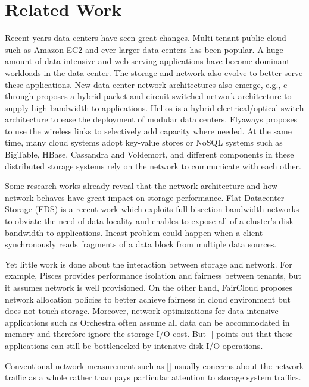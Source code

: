 \section{Related Work}
Recent years data centers have seen great changes. Multi-tenant public cloud such as Amazon EC2 and ever larger data centers has been popular. A huge amount of data-intensive and web serving applications have become dominant workloads in the data center. The storage and network also evolve to better serve these applications. New data center network architectures also emerge, e.g.,  c-through proposes a hybrid packet and circuit switched network architecture to supply high bandwidth to applications. Helios is a hybrid electrical/optical switch architecture to ease the deployment of modular data centers. Flyaways proposes to use the wireless links to selectively add capacity where needed. At the same time, many cloud systems adopt key-value stores or NoSQL systems such as BigTable, HBase, Cassandra and Voldemort, and different components in these distributed storage systems rely on the network to communicate with each other.

Some research works already reveal that the network architecture and how network behaves have great impact on storage performance. Flat Datacenter Storage (FDS) is a recent work which exploits full bisection bandwidth networks to obviate the need of data locality and enables to expose all of a cluster’s disk bandwidth to applications. Incast problem could happen when a client synchronously reads fragments of a data block from multiple data sources.

Yet little work is done about the interaction between storage and network. For example, Pisces provides performance isolation and fairness between tenants, but it assumes network is well provisioned. On the other hand, FairCloud proposes network allocation policies to better achieve fairness in cloud environment but does not touch storage. Moreover, network optimizations for data-intensive applications such as Orchestra often assume all data can be accommodated in memory and therefore ignore the storage I/O cost. But [] points out that these applications can still be bottlenecked by intensive disk I/O operations.

Conventional network measurement such as [] usually concerns about the network traffic as a whole rather than pays particular attention to storage system traffics.
